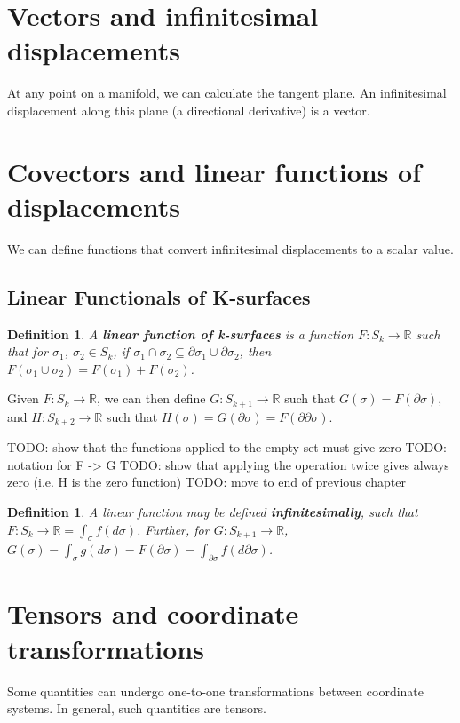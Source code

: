 \documentclass{book}
\newtheorem{defn}[equation]{Definition}
\begin{document}
\section{Vectors and infinitesimal displacements}
At any point on a manifold, we can calculate the tangent plane. An infinitesimal displacement along this plane (a directional derivative) is a vector. 


\section{Covectors and linear functions of displacements}
We can define functions that convert infinitesimal displacements to a scalar value. 

\subsection{Linear Functionals of K-surfaces}


\begin{defn}
	A \textbf{linear function of k-surfaces} is a function $F : S_k \to \mathbb{R}$ such that for $\sigma_1$, $\sigma_2 \in S_k$, if $\sigma_1 \cap \sigma_2 \subseteq \partial\sigma_1 \cup \partial\sigma_2$, then $F(\sigma_1\cup\sigma_2) = F(\sigma_1) + F(\sigma_2)$. 
\end{defn}


Given $F : S_k \to \mathbb{R}$, we can then define $G : S_{k+1} \to \mathbb{R}$ such that $G(\sigma) = F(\partial\sigma)$, and $H : S_{k+2} \to \mathbb{R}$ such that $H(\sigma) = G(\partial\sigma) = F(\partial\partial\sigma)$. 

TODO: show that the functions applied to the empty set must give zero
TODO: notation for F -> G
TODO: show that applying the operation twice gives always zero (i.e. H is the zero function)
TODO: move to end of previous chapter

\begin{defn}
	A linear function may be defined \textbf{infinitesimally}, such that $F : S_k \to \mathbb{R} = \int_{\sigma} f(d\sigma)$. Further, for $G : S_{k+1} \to \mathbb{R}$, $G(\sigma) = \int_{\sigma} g(d\sigma) = F(\partial\sigma) = \int_{\partial\sigma}f(d\partial\sigma)$. 
\end{defn}


\section{Tensors and coordinate transformations}
Some quantities can undergo one-to-one transformations between coordinate systems. In general, such quantities are tensors. 
\end{document}
